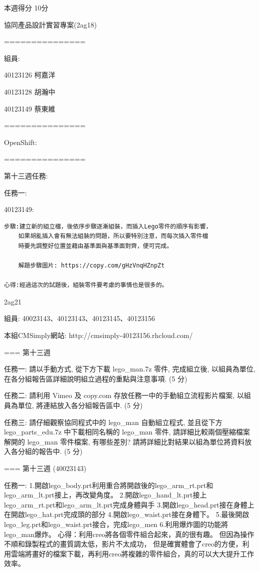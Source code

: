 \documentclass[]{article}
\begin{document}
本週得分 10分

協同產品設計實習專案(2ag18)

===============

組員:

40123126 柯嘉洋

40123128 胡瀚中

40123149 蔡東維

===============

OpenShift:

===============

第十三週任務:

任務一:

40123149:

\begin{verbatim}
步驟:建立新的組立檔，後依序步驟逐漸組裝，而插入Lego零件的順序有影響，
    如果胡亂插入會有無法組裝的問題，所以要特別注意，而每次插入零件檔
    時要先調整好位置並藉由基準面與基準面對齊，便可完成。

    解題步驟圖片: https://copy.com/gHzVnqHZnpZt
    
心得:經過這次的試題後，組裝零件要考慮的事情也是很多的。
\end{verbatim}

2ag21

組員: 40023143、40123143、40123145、40123156

本組CMSimply網站: http://cmsimply-40123156.rhcloud.com/

=== 第十三週

任務一: 請以手動方式, 從下方下載 lego\_man.7z 零件, 完成組立後,
以組員為單位, 在各分組報告區詳細說明組立過程的重點與注意事項. (5 分)

任務二: 請利用 Vimeo 及 copy.com 存放任務一中的手動組立流程影片檔案,
以組員為單位, 將連結放入各分組報告區中. (5 分)

任務三: 請仔細觀察協同程式中的 lego\_man 自動組立程式, 並且從下方
lego\_parts\_edu.7z 中下載相同名稱的 lego\_man 零件,
請詳細比較兩個壓縮檔案解開的 lego\_man 零件檔案, 有哪些差別?
請將詳細比對結果以組為單位將資料放入各分組的報告中. (5 分)

=== 第十三週 (40023143)

任務一:
1.開啟lego\_body.prt利用重合將開啟後的lego\_arm\_rt.prt和lego\_arm\_lt.prt接上，再改變角度。
2.開啟lego\_hand\_lt.prt接上lego\_arm\_rt.prt和lego\_arm\_lt.prt完成身體與手
3.開啟lego\_head.prt接在身體上在開啟lego\_hat.prt完成頭的部分
4.開啟lego\_waist.prt接在身體下。
5.最後開啟lego\_leg.prt和lego\_waist.prt接合，完成lego\_men
6.利用爆炸圖的功能將lego\_man爆炸。
心得：利用creo將各個零件組合起來，真的很有趣。
但因為操作不順和錄製程式的畫質調太低，影片不太成功，
但是確實體會了creo的方便，利用雲端將畫好的檔案下載，再利用creo將複雜的零件組合，真的可以大大提升工作效率。
\end{document}
